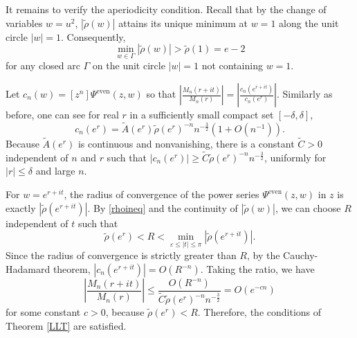 \documentclass[11pt,letterpaper]{amsart}
\numberwithin{equation}{section}
\newtheorem{theorem}{Theorem}[section]
\theoremstyle{definition}
\def\dim{\mathrm{dim} }
\def\beq{\begin{equation}}
\def\eeq{\end{equation}}
\begin{document}
It remains to verify the aperiodicity condition. Recall that by the change of variables $w= u^2$, $|\tilde{\rho}(w)|$ attains its unique minimum at $w=1$ along the unit circle $|w|=1$. Consequently,
\beq \label{rhoineq} \min_{w\in \Gamma} |\tilde{\rho}(w) |> \tilde{\rho}(1)= e-2 \eeq
for any closed arc $\Gamma$ on the unit circle $|w|=1$ not containing $w=1$.

Let $c_n(w) = [z^n]\Psi^\mathrm{even}(z, w) $ so that $ \left| \frac{M_n(r+it)}{M_n(r)}\right|=\left| \frac{c_n(e^{r+it})}{c_n(e^r)}\right| $. Similarly as before, one can see for real $r$ in a sufficiently small compact set $[-\delta, \delta]$,
$$c_n(e^r) = \tilde{A}(e^r) \tilde{\rho}(e^r)^{-n} n^{-\frac32} \left(1 + O(n^{-1})\right).$$
Because $\tilde{A}(e^r) $ is continuous and nonvanishing, there is a constant $\tilde{C}>0$ independent of $n$ and $r$ such that $|c_n(e^r)| \ge \tilde{C} \tilde{\rho}(e^r)^{-n} n^{-\frac32}$, uniformly for $|r|\le\delta$ and large $n$.

For $w= e^{r+it}$, the radius of convergence of the power series $\Psi^\mathrm{even}(z, w) $ in $z$ is exactly $ |\tilde{\rho} (e^{r+it}) |$. By \eqref{rhoineq} and the continuity of $|\tilde{\rho}(w)|$, we can choose $R$ independent of $t$ such that
$$\tilde{\rho}(e^r) < R < \min_{\varepsilon \le |t| \le \pi} |\tilde{\rho}(e^{r+it})|.$$
Since the radius of convergence is strictly greater than $R$, by the Cauchy-Hadamard theorem, $|c_n(e^{r+it})|= O(R^{-n})$. Taking the ratio, we have
\[\left| \frac{M_n(r+it)}{M_n(r)}\right|\le \frac{O(R^{-n})}{\tilde{C}\tilde{\rho}(e^r)^{-n} n^{-\frac32}} =O(e^{-cn}) \]
for some constant $c>0$, because $\tilde{\rho}(e^r) < R $. Therefore, the conditions of Theorem \ref{LLT} are satisfied.

\medskip 
\end{document}

